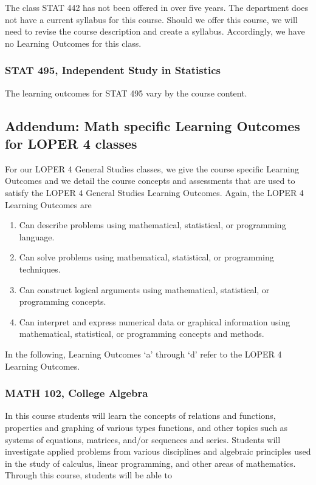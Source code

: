 \documentclass[11pt]{article}
\newenvironment{betalist}{
\begin{enumerate}[label=(\alph*),widest=zzz,leftmargin=25pt,itemsep=0pt]}
{\end{enumerate}}
\begin{document}
The class STAT 442 has not been offered in over five years. The
department does not have a current syllabus for this course. Should we offer this course,  we will need to revise
the course description and create a syllabus. Accordingly, we have no Learning Outcomes for this class.

\subsubsection{STAT 495, Independent Study in Statistics}

The learning outcomes for STAT 495 vary by the course content.



\subsection{\textbf{Addendum:} Math specific Learning Outcomes for LOPER 4 classes}

For our LOPER 4 General Studies classes, we give the course specific 
Learning Outcomes and we detail the course concepts and assessments that are
used to satisfy the LOPER 4 General Studies Learning Outcomes. Again, the LOPER 4 Learning Outcomes are
\begin{betalist}
    \item Can describe problems using mathematical, statistical, or programming language.
    \item Can solve problems using mathematical, statistical, or programming techniques.
    \item Can construct logical arguments using mathematical, statistical, or programming concepts.
    \item Can interpret and express numerical data or graphical information using 
       mathematical, statistical, or programming concepts and methods.
\end{betalist}
In the following, Learning Outcomes `a' through `d' refer to the 
LOPER 4 Learning Outcomes.

\subsubsection{MATH 102, College Algebra} 

In this course students will learn the concepts of relations and 
functions, properties and graphing of various types functions, and other topics such 
as systems of equations, matrices, and/or sequences and series. Students will 
investigate applied problems from various disciplines and 
algebraic principles used in the study of calculus, linear programming, and other 
areas of mathematics. Through this course, students will be able to
\end{document}
